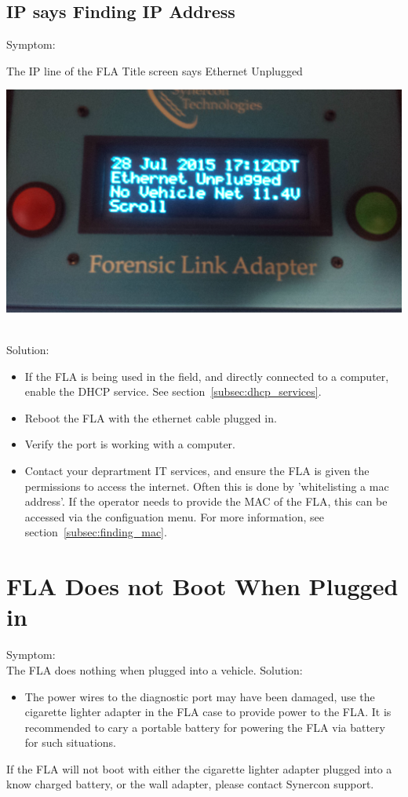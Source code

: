 \documentclass[11pt, oneside]{book}
\begin{document}
\subsection{IP says Finding IP Address}
Symptom:\\
\noindent\begin{minipage}{0.45\textwidth}%
The IP line of the FLA Title screen says Ethernet Unplugged
\end{minipage}%
\hfill%
\begin{minipage}{0.45\textwidth}
\includegraphics[width=\linewidth]{../media/fla_screens/title_screen_eth_unplug}
\end{minipage}\\
Solution:\\
\begin{itemize}
\item If the FLA is being used in the field, and directly connected to a computer, enable the DHCP service. See section~\ref{subsec:dhcp_services}.
\item Reboot the FLA with the ethernet cable plugged in.
\item Verify the port is working with a computer.
\item Contact your deprartment IT services, and ensure the FLA is given the permissions to access the internet. Often this is done by 'whitelisting a mac address'. If the operator needs to provide the MAC of the FLA, this can be accessed via the configuation menu. For more information, see section~\ref{subsec:finding_mac}.
\end{itemize}
\section{FLA Does not Boot When Plugged in}
Symptom:\\
The FLA does nothing when plugged into a vehicle.
Solution:\\
\begin{itemize}
\item The power wires to the diagnostic port may have been damaged, use the cigarette lighter adapter in the FLA case to provide power to the FLA. It is recommended to cary a portable battery for powering the FLA via battery for such situations.
\end{itemize}
If the FLA will not boot with either the cigarette lighter adapter plugged into a know charged battery, or the wall adapter, please contact Synercon support.
\end{document}
